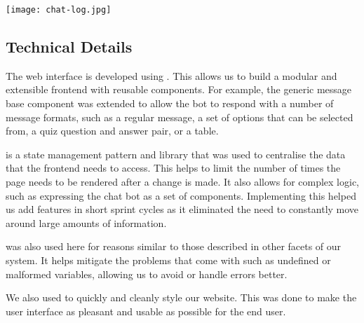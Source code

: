 \texttt{[image: chat-log.jpg]}

\subsection{Technical Details}
The web interface is developed using . This allows us to build a modular and extensible frontend with reusable components. For example, the generic message base component was extended to allow the bot to respond with a number of message formats, such as a regular message, a set of options that can be selected from, a quiz question and answer pair, or a table.

 is a state management pattern and library that was used to centralise the data that the frontend needs to access. This helps to limit the number of times the page needs to be rendered after a change is made. It also allows for complex logic, such as expressing the chat bot as a set of components. Implementing this helped us add features in short sprint cycles as it eliminated the need to constantly move around large amounts of information.

 was also used here for reasons similar to those described in other facets of our system. It helps mitigate the problems that come with  such as undefined or malformed variables, allowing us to avoid or handle errors better.

We also used  to quickly and cleanly style our website. This was done to make the user interface as pleasant and usable as possible for the end user.

\newpage
